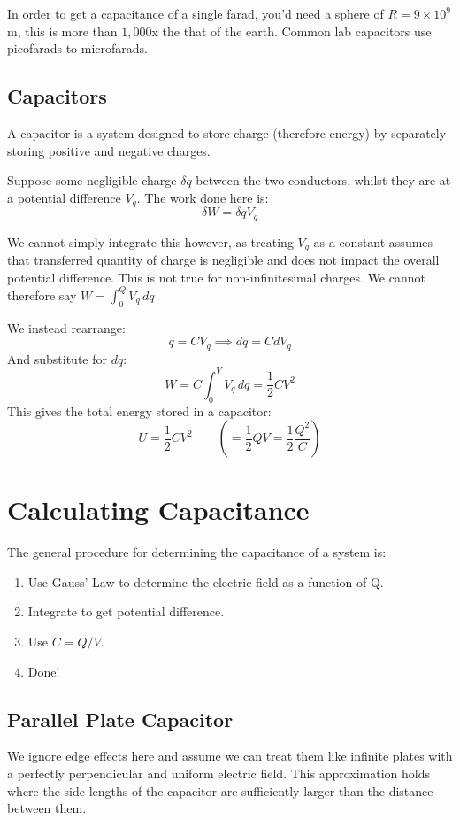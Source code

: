In order to get a capacitance of a single farad, you'd need a sphere of $R = 9 \times 10^9$m, this is more than $1,000$x the that of the earth. Common lab capacitors use picofarads to microfarads.


\subsection{Capacitors}
A capacitor is a system designed to store charge (therefore energy) by separately storing positive and negative charges.

Suppose some negligible charge $\delta q$ between the two conductors, whilst they are at a potential difference $V_q$. The work done here is:
\[
    \delta W = \delta q V_q
\]

We cannot simply integrate this however, as treating $V_q$ as a constant assumes that transferred quantity of charge is negligible and does not impact the overall potential difference. This is not true for non-infinitesimal charges. We cannot therefore say $W = \int_{0}^{Q} V_q \, dq$

We instead rearrange:
\[
    q = C V_q \implies dq = C dV_q
\]
And substitute for $dq$:
\[
    W = C \int_{0}^{V} V_q \, dq = \frac{1}{2}CV^2
\]
This gives the total energy stored in a capacitor:
\[
    U = \frac{1}{2}CV^2 \qquad \left(= \frac{1}{2}QV = \frac{1}{2}\frac{Q^2}{C}\right)
\]

\section{Calculating Capacitance}
The general procedure for determining the capacitance of a system is:
\begin{enumerate}
    \item Use Gauss' Law to determine the electric field as a function of Q.
    \item Integrate to get potential difference.
    \item Use $C = Q/V$.
    \item Done!
\end{enumerate}

\subsection{Parallel Plate Capacitor}
We ignore edge effects here and assume we can treat them like infinite plates with a perfectly perpendicular and uniform electric field. This approximation holds where the side lengths of the capacitor are sufficiently larger than the distance between them. 


